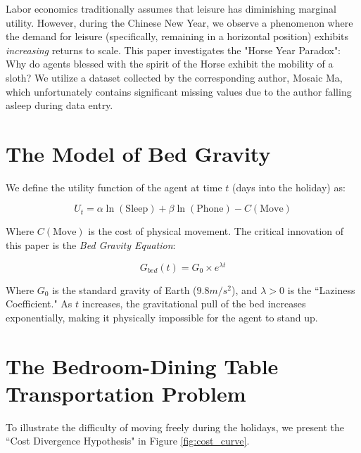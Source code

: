 \documentclass[AER]{AEA}
\begin{document}

Labor economics traditionally assumes that leisure has diminishing marginal utility. However, during the Chinese New Year, we observe a phenomenon where the demand for leisure (specifically, remaining in a horizontal position) exhibits \textit{increasing} returns to scale. This paper investigates the "Horse Year Paradox": Why do agents blessed with the spirit of the Horse exhibit the mobility of a sloth? We utilize a dataset collected by the corresponding author, Mosaic Ma, which unfortunately contains significant missing values due to the author falling asleep during data entry.

\section{The Model of Bed Gravity}

We define the utility function of the agent at time $t$ (days into the holiday) as:

\begin{equation}
    U_t = \alpha \ln(\text{Sleep}) + \beta \ln(\text{Phone}) - C(\text{Move})
\end{equation}

Where $C(\text{Move})$ is the cost of physical movement. The critical innovation of this paper is the \textit{Bed Gravity Equation}:

\begin{equation}
    G_{bed}(t) = G_0 \times e^{\lambda t}
\end{equation}

Where $G_0$ is the standard gravity of Earth ($9.8 m/s^2$), and $\lambda > 0$ is the ``Laziness Coefficient." As $t$ increases, the gravitational pull of the bed increases exponentially, making it physically impossible for the agent to stand up.

\section{The Bedroom-Dining Table Transportation Problem}

To illustrate the difficulty of moving freely during the holidays, we present the ``Cost Divergence Hypothesis" in Figure \ref{fig:cost_curve}.
\end{document}
